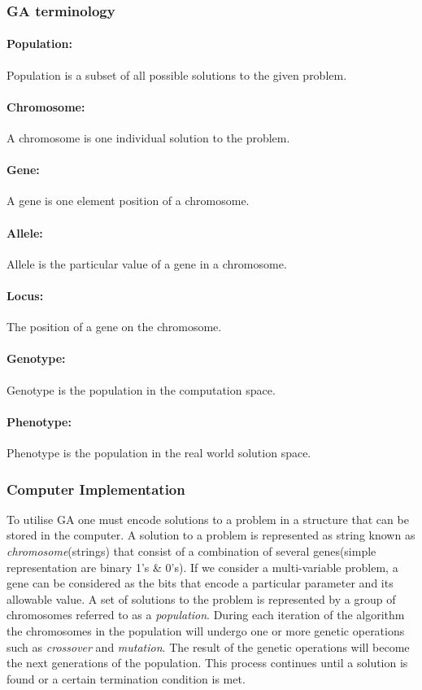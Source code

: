 \subsubsection{GA terminology}
\paragraph{Population:}
Population is a subset of all possible solutions to the given problem.
\paragraph{Chromosome:}
A chromosome is one individual solution to the problem.
\paragraph{Gene:}
A gene is one element position of a chromosome.
\paragraph{Allele:}
Allele is the particular value of a gene in a chromosome.
\paragraph{Locus:}
The position of a gene on the chromosome.
\paragraph{Genotype:}
Genotype is the population in the computation space.
\paragraph{Phenotype:}
Phenotype is the population in the real world solution space.
\citep{Murphy:03}
 
\subsubsection{Computer Implementation}
To utilise GA one must encode solutions to a problem in a structure that can be stored in the computer. A solution to a problem is represented as  string known as \emph{chromosome}(strings) that consist of a combination of several genes(simple representation are binary 1's \& 0's). If we consider a multi-variable problem, a gene can be considered as the bits that encode a particular parameter and its allowable value. A set of solutions to the problem is represented by a group of chromosomes referred to as a \emph{population}. During each iteration of the algorithm the chromosomes in the population will undergo one or more genetic operations such as \emph{crossover} and \emph{mutation}. The result of the genetic operations will become the next generations of the population. This process continues until a solution is found or a certain termination condition is met. \citep{Murphy:03}

